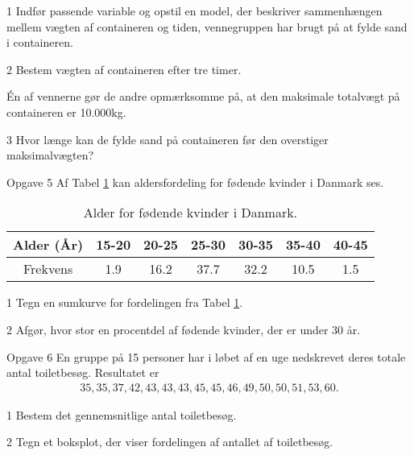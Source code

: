 \begin{delopgave}{}{1}
	Indfør passende variable og opstil en model, der beskriver sammenhængen mellem vægten af containeren og tiden, vennegruppen har brugt på at fylde sand i containeren. 
\end{delopgave}
\begin{delopgave}{}{2}
	Bestem vægten af containeren efter tre timer. 
\end{delopgave}
\begin{meretekst}
	Én af vennerne gør de andre opmærksomme på, at den maksimale totalvægt på containeren er 10.000kg.
\end{meretekst}
\begin{delopgave}{}{3}
	Hvor længe kan de fylde sand på containeren før den overstiger maksimalvægten?
\end{delopgave}
\begin{opgavetekst}{Opgave 5}
	Af Tabel \ref{tab:labour} kan aldersfordeling for fødende kvinder i Danmark ses.
	\begin{table}[H]
	\centering	
	\begin{tabular}{c|c|c|c|c|c|c}
		Alder (År) & 15-20 & 20-25 & 25-30 & 30-35 & 35-40 & 40-45\\
		\hline
		Frekvens & 1.9 & 16.2 & 37.7 & 32.2 & 10.5 & 1.5
	\end{tabular}
	\caption{Alder for fødende kvinder i Danmark.}
	\label{tab:labour}
	\end{table}
	\phantom{h}
\end{opgavetekst}
\begin{delopgave}{}{1}
	Tegn en sumkurve for fordelingen fra Tabel \ref{tab:labour}.
\end{delopgave}
\begin{delopgave}{}{2}
	Afgør, hvor stor en procentdel af fødende kvinder, der er under 30 år.
\end{delopgave}

\begin{opgavetekst}{Opgave 6}
	En gruppe på 15 personer har i løbet af en uge nedskrevet deres totale antal toiletbesøg. Resultatet er 
	\begin{align*}
		35,35,37,42,43,43,43,45,45,46,49,50,50,51,53,60.
	\end{align*}
\end{opgavetekst}
\begin{delopgave}{}{1}
	Bestem det gennemsnitlige antal toiletbesøg.
\end{delopgave}
\begin{delopgave}{}{2}
	Tegn et boksplot, der viser fordelingen af antallet af toiletbesøg. 
\end{delopgave}
